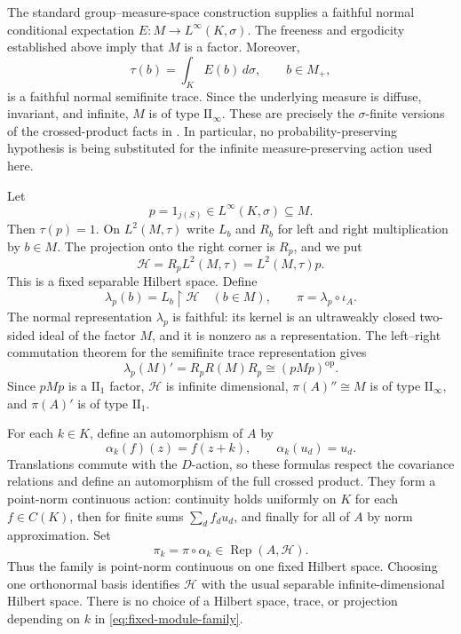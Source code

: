 \documentclass[11pt]{article}
\theoremstyle{definition}
\newcommand{\Rep}{\operatorname{Rep}}
\begin{document}
The standard group--measure-space construction supplies a faithful
normal conditional expectation $E:M\to L^\infty(K,\sigma)$.
The freeness and ergodicity established above imply that $M$ is a
factor. Moreover,
\[
 \tau(b)=\int_K E(b)\,d\sigma,\qquad b\in M_+,
\]
is a faithful normal semifinite trace. Since the underlying measure is
diffuse, invariant, and infinite, $M$ is of type $\mathrm{II}_\infty$.
These are precisely the $\sigma$-finite versions of the crossed-product
facts in \cite[Theorems~5.2.2 and~5.2.4]{Peterson}. In particular, no
probability-preserving hypothesis is being substituted for the infinite
measure-preserving action used here.

Let
\[
 p=1_{j(S)}\in L^\infty(K,\sigma)\subseteq M.
\]
Then $\tau(p)=1$. On $L^2(M,\tau)$ write $L_b$ and $R_b$ for left
and right multiplication by $b\in M$. The projection onto the right
corner is $R_p$, and we put
\[
 \mathcal H=R_pL^2(M,\tau)=L^2(M,\tau)p.
\]
This is a fixed separable Hilbert space. Define
\[
 \lambda_p(b)=L_b\mathbin{\upharpoonright}\mathcal H\quad(b\in M),
 \qquad \pi=\lambda_p\circ\iota_A.
\]
The normal representation $\lambda_p$ is faithful: its kernel is an
ultraweakly closed two-sided ideal of the factor $M$, and it is nonzero
as a representation. The left--right commutation theorem for the
semifinite trace representation gives
\[
 \lambda_p(M)'=R_pR(M)R_p\cong(pMp)^{\mathrm{op}}.
\]
Since $pMp$ is a $\mathrm{II}_1$ factor, $\mathcal H$ is infinite
dimensional, $\pi(A)''\cong M$ is of type $\mathrm{II}_\infty$, and
$\pi(A)'$ is of type $\mathrm{II}_1$.

For each $k\in K$, define an automorphism of $A$ by
\[
 \alpha_k(f)(z)=f(z+k),\qquad \alpha_k(u_d)=u_d.
\]
Translations commute with the $D$-action, so these formulas respect
the covariance relations and define an automorphism of the full crossed
product. They form a point-norm continuous action: continuity holds
uniformly on $K$ for each $f\in C(K)$, then for finite sums $\sum_d f_du_d$,
and finally for all of $A$ by norm approximation. Set
\begin{equation}
 \pi_k=\pi\circ\alpha_k\in\Rep(A,\mathcal H).
 \label{eq:fixed-module-family}
\end{equation}
Thus the family is point-norm continuous on one fixed Hilbert space.
Choosing one orthonormal basis identifies $\mathcal H$ with the usual
separable infinite-dimensional Hilbert space. There is no choice of a
Hilbert space, trace, or projection depending on $k$ in
\eqref{eq:fixed-module-family}.
\end{document}

